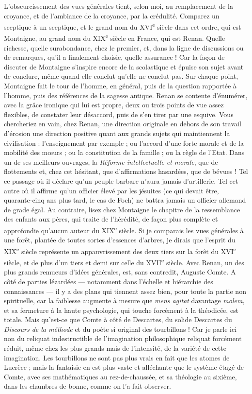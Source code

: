 \documentclass[french,twoside]{book} %
\begin{document}
L’obscurcissement des vues générales tient, selon moi, au remplacement de la croyance, et de l’ambiance de la croyance, par la crédulité. Comparez un sceptique à un sceptique, et le grand nom du XVI\textsuperscript{e} siècle dans cet ordre, qui est Montaigne, au grand nom du XIX\textsuperscript{e} siècle en France, qui est Renan. Quelle richesse, quelle surabondance, chez le premier, et, dans la ligne de discussions ou de remarques, qu’il a finalement choisie, quelle assurance ! Car la façon de discuter de Montaigne s’inspire encore de la scolastique et épuise son sujet avant de conclure, même quand elle conclut qu’elle ne conclut pas. Sur chaque point, Montaigne fait le tour de l’homme, en général, puis de la question rapportée à l’homme, puis des références de la sagesse antique. Renan se contente d’énumérer, avec la grâce ironique qui lui est propre, deux ou trois points de vue assez flexibles, de constater leur désaccord, puis de s’en tirer par une esquive. Vous chercheriez en vain, chez Renan, une direction originale en dehors de son travail d’érosion une direction positive quant aux grands sujets qui maintiennent la civilisation : l’enseignement par exemple ; ou l’accord d’une forte morale et de la mobilité des mœurs ; ou la constitution de la famille ; ou la règle de l’Etat. Dans un de ses meilleurs ouvrages, la {\itshape Réforme intellectuelle et morale}, que de flottements et, chez cet hésitant, que d’affirmations hasardées, que de bévues ! Tel ce passage où il déclare qu’un peuple barbare n’aura jamais d’artillerie. Tel cet autre où il affirme qu’un officier élevé par les jésuites (ce qui devait être, quarante-cinq ans plus tard, le cas de Foch) ne battra jamais un officier allemand de grade égal. Au contraire, lisez chez Montaigne le chapitre de la ressemblance des enfants aux pères, qui traite de l’hérédité, de façon plus complète et approfondie qu’aucun auteur du XIX\textsuperscript{e} siècle. Si je comparais les vues générales à une forêt, plantée de toutes sortes d’essences d’arbres, je dirais que l’esprit du XIX\textsuperscript{e} siècle représente un appauvrissement des deux tiers sur la forêt du XVI\textsuperscript{e} siècle, et de plus d’un tiers et demi sur celle du XVII\textsuperscript{e} siècle. Avec Renan, un des plus grands remueurs d’idées générales, est, sans contredit, Auguste Comte. A côté de parties lézardées — notamment dans l’échelle et hiérarchie des connaissances — il y a des plans qui tiennent assez bien, pour toute la partie non spirituelle, car la faiblesse augmente à mesure que {\itshape mens agitat} davantage {\itshape molem}, et sa fermeture à la haute psychologie, qui touche forcément à la théodicée, est totale. Mais qu’est-ce que Comte à côté de Descartes, du solide Descartes du {\itshape Discours de la méthode} et du poète si original des tourbillons ! Car je parle ici non du reliquat indestructible de l’imagination philosophique reliquat forcément réduit, même chez les plus grands mais de l’intensité, de la variété de cette imagination. Les tourbillons ne sont pas plus vrais en fait que les atomes de Lucrèce ; mais la fantaisie en est plus vaste et alléchante que le système étagé de Comte, avec ses mathématiques au rez-de-chaussée, et sa théologie au sixième, dans les chambres de bonne, comme on l’a fait observer.\par
\end{document}

